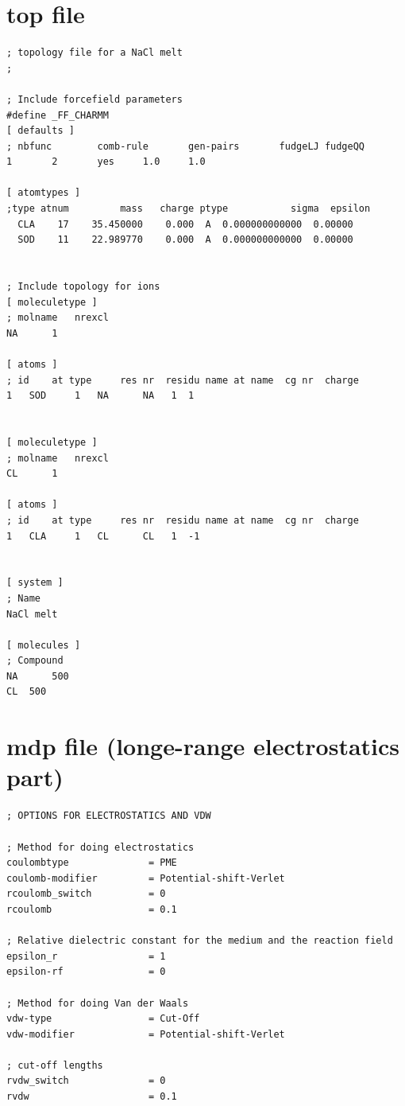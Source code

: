 \documentclass[10pt,twoside,a4paper]{report}
\begin{document}
\begin{appendices}
\section{top file}


\begin{verbatim}
; topology file for a NaCl melt
;

; Include forcefield parameters
#define _FF_CHARMM
[ defaults ]
; nbfunc        comb-rule       gen-pairs       fudgeLJ fudgeQQ
1       2       yes     1.0     1.0

[ atomtypes ]
;type atnum         mass   charge ptype           sigma  epsilon
  CLA    17    35.450000    0.000  A  0.000000000000  0.00000
  SOD    11    22.989770    0.000  A  0.000000000000  0.00000


; Include topology for ions
[ moleculetype ]
; molname   nrexcl
NA      1

[ atoms ]
; id    at type     res nr  residu name at name  cg nr  charge   
1   SOD     1   NA      NA   1  1        


[ moleculetype ]
; molname   nrexcl
CL      1

[ atoms ]
; id    at type     res nr  residu name at name  cg nr  charge   
1   CLA     1   CL      CL   1  -1   


[ system ]
; Name
NaCl melt

[ molecules ]
; Compound
NA      500
CL	500 

\end{verbatim}




\section{mdp file (longe-range electrostatics part)}

\begin{verbatim}
; OPTIONS FOR ELECTROSTATICS AND VDW

; Method for doing electrostatics
coulombtype              = PME
coulomb-modifier         = Potential-shift-Verlet
rcoulomb_switch          = 0
rcoulomb                 = 0.1

; Relative dielectric constant for the medium and the reaction field
epsilon_r                = 1
epsilon-rf               = 0

; Method for doing Van der Waals
vdw-type                 = Cut-Off
vdw-modifier             = Potential-shift-Verlet

; cut-off lengths       
rvdw_switch              = 0
rvdw                     = 0.1


\end{verbatim}
\end{appendices}
\end{document}
